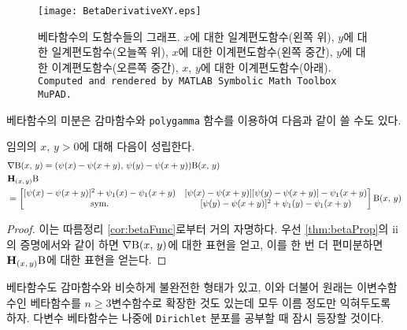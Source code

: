 \begin{figure}[!ht]
    \vspace{-3.5em}
    \centering
\end{figure}

\begin{figure}[!ht]
    \vspace{-4em}
    \centering
    \texttt{[image: BetaDerivativeXY.eps]}
    \caption{베타함수의 도함수들의 그래프. $x$에 대한 일계편도함수(왼쪽 위), $y$에 대한 일계편도함수(오늘쪽 위), $x$에 대한 이계편도함수(왼쪽 중간), $y$에 대한 이계편도함수(오른쪽 중간), $x,\,y$에 대한 이계편도함수(아래). \texttt{Computed and rendered by MATLAB Symbolic Math Toolbox MuPAD.}}
\end{figure}

베타함수의 미분은 감마함수와 \texttt{polygamma} 함수를 이용하여 다음과 같이 쓸 수도 있다.

\begin{proposition}
    임의의 $x,\,y>0$에 대해 다음이 성립한다.
    \begin{align*}
        &\nabla\Be(x,\,y)=(\psi(x)-\psi(x+y),\,\psi(y)-\psi(x+y))\Be(x,\,y)\\
        &\mathbf{H}_{(x,\,y)}\Be\\
        &=\begin{bmatrix*}
            [\psi(x)-\psi(x+y)]^2+\psi_1(x)-\psi_1(x+y)&[\psi(x)-\psi(x+y)][\psi(y)-\psi(x+y)]-\psi_1(x+y)\\
            \mathrm{sym.}&[\psi(y)-\psi(x+y)]^2+\psi_1(y)-\psi_1(x+y)
        \end{bmatrix*}
        \Be(x,\,y)
    \end{align*}
\end{proposition}

\begin{proof}
    이는 따름정리 \ref{cor:betaFunc}로부터 거의 자명하다. 우선 \ref{thm:betaProp}의 ii의 증명에서와 같이 하면 $\nabla\mathrm{B}(x,\,y)$에 대한 표현을 얻고, 이를 한 번 더 편미분하면 $\mathbf{H}_{(x,\,y)}\mathrm{B}$에 대한 표현을 얻는다.
\end{proof}

베타함수도 감마함수와 비슷하게 불완전한 형태가 있고, 이와 더불어 원래는 이변수함수인 베타함수를 $n\geq3$변수함수로 확장한 것도 있는데 모두 이름 정도만 익혀두도록 하자. 다변수 베타함수는 나중에 \texttt{Dirichlet} 분포를 공부할 때 잠시 등장할 것이다.

